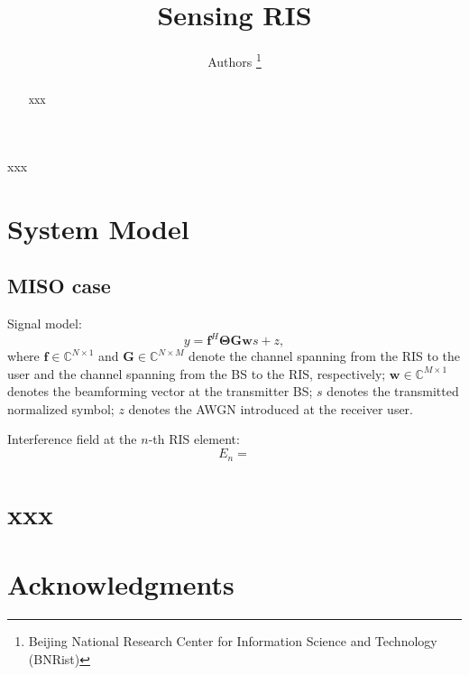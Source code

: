 \documentclass[12pt,draftclsnofoot,journal,onecolumn]{IEEEtran}
\theoremstyle{nonumberplain}
\begin{document}
\title{Sensing RIS}
\author{{Authors
\vspace*{-1em}}
\thanks{Beijing National Research Center for Information Science and Technology (BNRist)}
}

\maketitle

\begin{abstract}
xxx
\end{abstract}

\begin{IEEEkeywords}
xxx
\end{IEEEkeywords}

\section{System Model}
\label{System Model}
\subsection{MISO case}
\label{MISO case}

Signal model:
\begin{equation}
\label{Signal model}
y=\bm f^{H}\bm \Theta\bm G\bm ws+z,
\end{equation}
where $\bm f\in \mathbb C ^{N\times 1}$ and $\bm G \in \mathbb C^{N\times M}$ denote the channel spanning from the RIS to the user and the channel spanning from the BS to the RIS, respectively; $\bm w\in \mathbb C^{M\times 1}$ denotes the beamforming vector at the transmitter BS; $s$ denotes the transmitted normalized symbol; $z$ denotes the \ac{AWGN} introduced at the receiver user.

Interference field at the $n$-th RIS element:
\begin{equation}
\label{interference}
E_{n}=
\end{equation}


\appendices
\section{xxx}

\section*{Acknowledgments}


\footnotesize
\balance 


\end{document}

